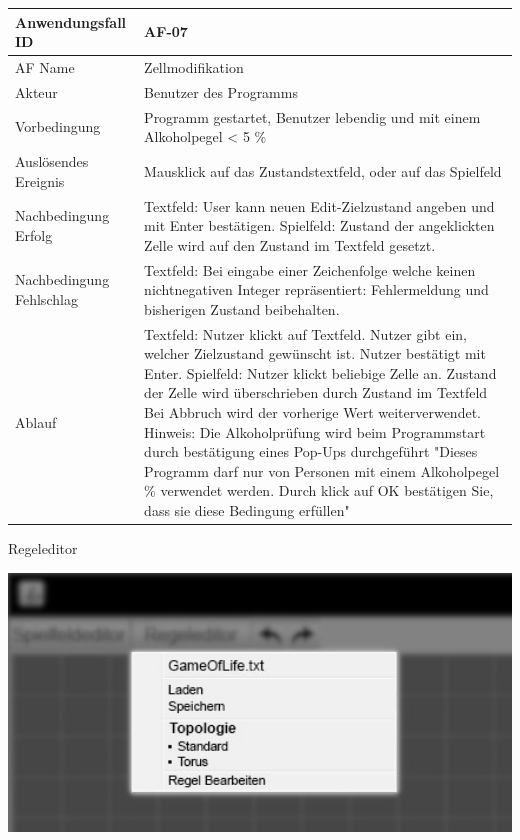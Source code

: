 \documentclass[11pt,a4paper]{article}
\begin{document}
\begin{tabular}[m]{|m{7cm}|m{9cm}|}
    \hline
    Anwendungsfall ID     & AF-07 \\
         \hline
    AF Name     & Zellmodifikation \\
         \hline
    Akteur&Benutzer des Programms \\
    \hline
    Vorbedingung&Programm gestartet, Benutzer lebendig und mit einem Alkoholpegel < 5 \% \\
    \hline
    Auslösendes Ereignis&Mausklick auf das Zustandstextfeld, oder auf das Spielfeld\\
    \hline
    Nachbedingung Erfolg& Textfeld: User kann neuen Edit-Zielzustand angeben und mit Enter bestätigen. Spielfeld: Zustand der angeklickten Zelle wird auf den Zustand im Textfeld gesetzt. \\
    \hline
    Nachbedingung Fehlschlag&Textfeld: Bei eingabe einer Zeichenfolge welche keinen nichtnegativen Integer repräsentiert: Fehlermeldung und bisherigen Zustand beibehalten.\\
    \hline
    Ablauf&Textfeld: Nutzer klickt auf Textfeld. Nutzer gibt ein, welcher Zielzustand gewünscht ist. Nutzer bestätigt mit Enter. 
    Spielfeld: Nutzer klickt beliebige Zelle an. Zustand der Zelle wird überschrieben durch Zustand im Textfeld
    Bei Abbruch wird der vorherige Wert weiterverwendet.
    \newline Hinweis: Die Alkoholprüfung wird beim Programmstart durch bestätigung eines Pop-Ups durchgeführt "Dieses Programm darf nur von Personen mit einem Alkoholpegel \< 5\% verwendet werden. Durch klick auf OK bestätigen Sie, dass sie diese Bedingung erfüllen"\\
    \hline
\end{tabular}
\par

\pagebreak

    Regeleditor %

\par
\includegraphics[width=15cm]{regeleditor_dropdown_edit} %
\end{document}

